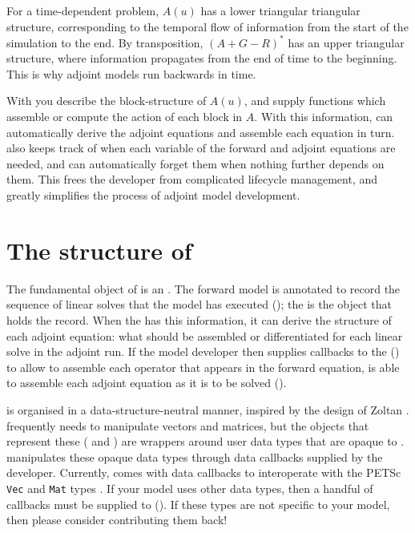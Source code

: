 For a time-dependent problem, $A(u)$ has a lower triangular triangular structure,
corresponding to the temporal flow of information from the start of the simulation
to the end. By transposition, $(A + G - R)^*$ has an upper triangular structure, where
information propagates from the end of time to the beginning. This is why adjoint
models run backwards in time.

With \libadjoint you describe the block-structure of $A(u)$,
and supply functions which assemble or compute the action of each block in $A$.
With this information, \libadjoint can automatically derive the adjoint equations
and assemble each equation in turn. \libadjoint also keeps track of when each
variable of the forward and adjoint equations are needed, and can automatically
forget them when nothing further depends on them. This frees the developer from
complicated lifecycle management, and greatly simplifies the process of adjoint model
development.

\section{The structure of \libadjoint}
The fundamental object of \libadjoint is an \adjointer. The forward model is annotated
to record the sequence of linear solves that the model has executed (); the \adjointer is
the object that holds the record. When the \adjointer has this information, it can derive
the structure of each adjoint equation: what should be assembled or differentiated for each linear
solve in the adjoint run. If the model developer then
supplies callbacks to the \adjointer () to allow \libadjoint to assemble each
operator that appears in the forward equation, \libadjoint is
able to assemble each adjoint equation as it is to be solved ().

\libadjoint is organised in a data-structure-neutral manner, inspired by the design
of Zoltan \citep{devine2002}. \libadjoint frequently needs to manipulate vectors
and matrices, but the objects that represent these ( and )
are wrappers around user data types that are opaque to \libadjoint. \libadjoint manipulates
these opaque data types through data callbacks supplied by the developer. Currently, \libadjoint
{}
comes with data callbacks to interoperate with the PETSc \texttt{Vec} and \texttt{Mat} types \citep{balay2010}.
If your model uses other data types, then a handful of callbacks must be supplied to \libadjoint ().
If these types are not specific to your model, then please consider contributing them back!

